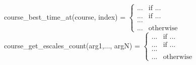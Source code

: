 course\_best\_time\_at(course, index) = $
                \begin{cases}
                    ... & \text{if } ... \\
                    ... & \text{if } ... \\
                            ...          \\
                    ... & \text{otherwise}
                \end{cases} $
course\_get\_escales\_count(arg1,..., argN) = $
                \begin{cases}
                    ... & \text{if } ... \\
                    ... & \text{if } ... \\
                            ...          \\
                    ... & \text{otherwise}
                \end{cases} $

















